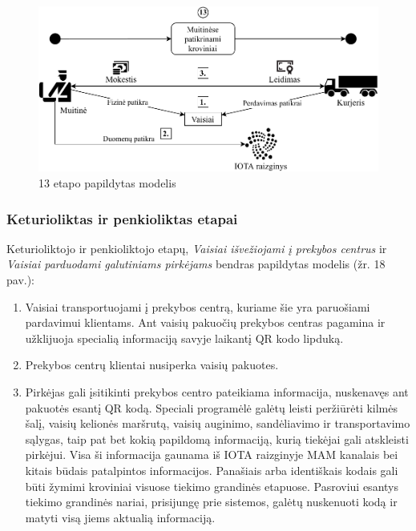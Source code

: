 \begin{figure}[H]
    \centering
    \includegraphics[scale=0.8]{images/iota-usecase-13}
    \caption{13 etapo papildytas modelis}
\end{figure}




\subsubsection{Keturioliktas ir penkioliktas etapai}

Keturioliktojo ir penkioliktojo etapų, \textit{Vaisiai išvežiojami į prekybos centrus} ir \textit{Vaisiai parduodami galutiniams pirkėjams} bendras papildytas modelis (žr. 18 pav.):
\begin{enumerate}
    \item Vaisiai transportuojami į prekybos centrą, kuriame šie yra paruošiami pardavimui klientams. Ant vaisių pakuočių prekybos centras pagamina ir užklijuoja specialią informaciją savyje laikantį QR kodo lipduką.
    \item Prekybos centrų klientai nusiperka vaisių pakuotes.
    \item Pirkėjas gali įsitikinti prekybos centro pateikiama informacija, nuskenavęs ant pakuotės esantį QR kodą. Speciali programėlė galėtų leisti peržiūrėti kilmės šalį, vaisių kelionės maršrutą, vaisių auginimo, sandėliavimo ir transportavimo sąlygas, taip pat bet kokią papildomą informaciją, kurią tiekėjai gali atskleisti pirkėjui. Visa ši informacija gaunama iš IOTA raizginyje MAM kanalais bei kitais būdais patalpintos informacijos. Panašiais arba identiškais kodais gali būti žymimi kroviniai visuose tiekimo grandinės etapuose. Pasroviui esantys tiekimo grandinės nariai, prisijungę prie sistemos, galėtų nuskenuoti kodą ir matyti visą jiems aktualią informaciją.
\end{enumerate}

